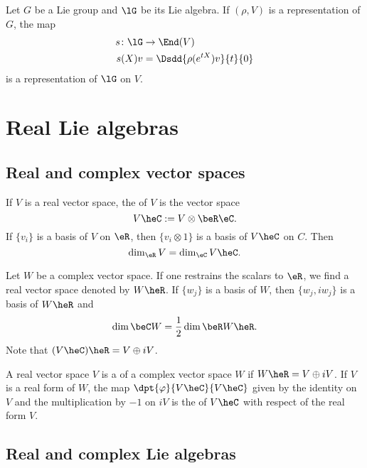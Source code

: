 \begin{theorem}       \label{THOooLVSNooOpzYgO}
    Let \( G\) be a Lie group and \( \lG\) be its Lie algebra. If \( (\rho, V)\) is a representation of \( G\), the map
    \begin{equation}
        \begin{aligned}
            s\colon \lG&\to \End(V) \\
            s(X)v&=\Dsdd{ \rho( e^{tX})v }{t}{0} 
        \end{aligned}
    \end{equation}
    is a representation of \( \lG\) on \( V\).
\end{theorem}

\section{Real Lie algebras}

\subsection{Real and complex vector spaces}

If $V$ is a real vector space, the  of $V$ is the vector space
\[
  V\heC:=V\otimes\beR\eC.
\]
If $\{v_i\}$ is a basis of $V$ on $\eR$, then $\{v_i\otimes 1\}$ is a basis of $V\heC$ on $C$. Then
\[
   \dim_{\eR}V=\dim_{\eC}V\heC.
\]

Let $W$ be a complex vector space. If one restrains the scalars to $\eR$, we find a real vector space denoted by $W\heR$. If $\{w_j\}$ is a basis of $W$, then $\{w_j,iw_j\}$ is a basis of $W\heR$ and
\[
  \dim\beC W=\frac{1}{2}\dim\beR W\heR.
\]
Note that $(V\heC)\heR=V\oplus iV$.

A real vector space $V$ is a  of a complex vector space $W$ if $W\heR=V\oplus iV$. If $V$ is a real form of $W$, the map $\dpt{\varphi}{V\heC}{V\heC}$ given by the identity on $V$ and the multiplication by $-1$ on $iV$ is the  of $V\heC$ with respect of the real form $V$.

\subsection{Real and complex Lie algebras}

